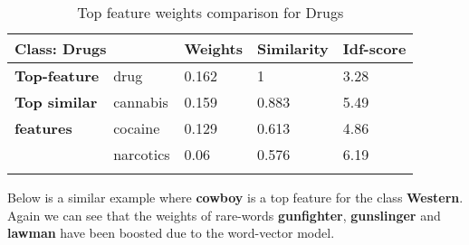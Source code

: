 \begin{table}[htbp]
\begin{tabular}{lllll}
\multicolumn{2}{l|}{\textbf{Class: Drugs}}                            & \multicolumn{1}{l|}{\textbf{Weights}} & \multicolumn{1}{l|}{\textbf{Similarity}} & \textbf{Idf-score} \\ \hline
\multicolumn{1}{l|}{\textbf{Top-feature}} & \multicolumn{1}{l|}{drug}      & \multicolumn{1}{l|}{0.162}            & \multicolumn{1}{l|}{1}                   & 3.28               \\ \hline
\multicolumn{1}{l|}{\textbf{Top similar}} & \multicolumn{1}{l|}{cannabis}  & \multicolumn{1}{l|}{0.159}            & \multicolumn{1}{l|}{0.883}               & 5.49               \\
\multicolumn{1}{l|}{\textbf{features}}    & \multicolumn{1}{l|}{cocaine}   & \multicolumn{1}{l|}{0.129}            & \multicolumn{1}{l|}{0.613}               & 4.86               \\
\multicolumn{1}{l|}{}                     & \multicolumn{1}{l|}{narcotics} & \multicolumn{1}{l|}{0.06}             & \multicolumn{1}{l|}{0.576}               & 6.19               \\
                                          &                                &                                       &                                          &                   
\end{tabular}
\caption{\label{tab:widgets}Top feature weights comparison for Drugs}
\end{table}

Below is a similar example where \textbf{cowboy} is a top feature for the class \textbf{Western}. Again we can see that the weights of rare-words \textbf{gunfighter}, \textbf{gunslinger} and \textbf{lawman} have been boosted due to the word-vector model.

